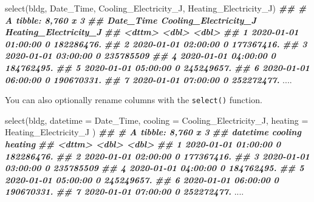\documentclass[
]{book}
\newenvironment{Shaded}{\begin{snugshade}}{\end{snugshade}}
\newcommand{\AttributeTok}[1]{\textcolor[rgb]{0.77,0.63,0.00}{#1}}
\newcommand{\DocumentationTok}[1]{\textcolor[rgb]{0.56,0.35,0.01}{\textbf{\textit{#1}}}}
\newcommand{\FunctionTok}[1]{\textcolor[rgb]{0.00,0.00,0.00}{#1}}
\newcommand{\NormalTok}[1]{#1}
\begin{document}
\begin{Shaded}
\begin{Highlighting}[]
\FunctionTok{select}\NormalTok{(bldg, Date\_Time, Cooling\_Electricity\_J, Heating\_Electricity\_J)}
\DocumentationTok{\#\# \# A tibble: 8,760 x 3}
\DocumentationTok{\#\#    Date\_Time           Cooling\_Electricity\_J Heating\_Electricity\_J}
\DocumentationTok{\#\#    \textless{}dttm\textgreater{}                              \textless{}dbl\textgreater{}                 \textless{}dbl\textgreater{}}
\DocumentationTok{\#\#  1 2020{-}01{-}01 01:00:00                     0            182286476.}
\DocumentationTok{\#\#  2 2020{-}01{-}01 02:00:00                     0            177367416.}
\DocumentationTok{\#\#  3 2020{-}01{-}01 03:00:00                     0            235785509 }
\DocumentationTok{\#\#  4 2020{-}01{-}01 04:00:00                     0            184762495.}
\DocumentationTok{\#\#  5 2020{-}01{-}01 05:00:00                     0            245249657.}
\DocumentationTok{\#\#  6 2020{-}01{-}01 06:00:00                     0            190670331.}
\DocumentationTok{\#\#  7 2020{-}01{-}01 07:00:00                     0            252272477.}
\NormalTok{....}
\end{Highlighting}
\end{Shaded}

You can also optionally rename columns with the \texttt{select()} function.

\begin{Shaded}
\begin{Highlighting}[]
\FunctionTok{select}\NormalTok{(bldg,}
  \AttributeTok{datetime =}\NormalTok{ Date\_Time,}
  \AttributeTok{cooling =}\NormalTok{ Cooling\_Electricity\_J,}
  \AttributeTok{heating =}\NormalTok{ Heating\_Electricity\_J}
\NormalTok{)}
\DocumentationTok{\#\# \# A tibble: 8,760 x 3}
\DocumentationTok{\#\#    datetime            cooling    heating}
\DocumentationTok{\#\#    \textless{}dttm\textgreater{}                \textless{}dbl\textgreater{}      \textless{}dbl\textgreater{}}
\DocumentationTok{\#\#  1 2020{-}01{-}01 01:00:00       0 182286476.}
\DocumentationTok{\#\#  2 2020{-}01{-}01 02:00:00       0 177367416.}
\DocumentationTok{\#\#  3 2020{-}01{-}01 03:00:00       0 235785509 }
\DocumentationTok{\#\#  4 2020{-}01{-}01 04:00:00       0 184762495.}
\DocumentationTok{\#\#  5 2020{-}01{-}01 05:00:00       0 245249657.}
\DocumentationTok{\#\#  6 2020{-}01{-}01 06:00:00       0 190670331.}
\DocumentationTok{\#\#  7 2020{-}01{-}01 07:00:00       0 252272477.}
\NormalTok{....}
\end{Highlighting}
\end{Shaded}
\end{document}
